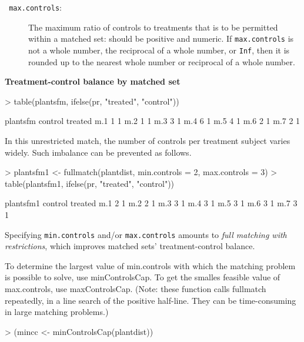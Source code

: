 \documentclass[12pt,twoside]{article}
\begin{document}
{{\begin{description}
\item[\texttt{ max.controls}:] The maximum ratio of controls
to treatments that is to be permitted within a matched set: should
be positive and numeric. If \texttt{max.controls} is not a whole
number, the reciprocal of a whole number, or \texttt{Inf}, then
it is rounded up to the nearest whole number or reciprocal of a
whole number.
\end{description}
\bigskip

{\rmfamily\bfseries
Treatment{}-control balance by matched set}


\begin{Schunk}
\begin{Sinput}
> table(plantsfm, ifelse(pr, "treated", "control"))
\end{Sinput}
\begin{Soutput}
plantsfm control treated
     m.1       1       1
     m.2       1       1
     m.3       3       1
     m.4       6       1
     m.5       4       1
     m.6       2       1
     m.7       2       1
\end{Soutput}
\end{Schunk}

\bigskip

{\ttfamily
\textrm{In this unrestricted match, the number of controls per treatment
subject varies widely. Such imbalance can be prevented as follows.}}


\bigskip
\begin{Schunk}
\begin{Sinput}
> plantsfm1 <- fullmatch(plantdist, min.controls = 2, max.controls = 3)
> table(plantsfm1, ifelse(pr, "treated", "control"))
\end{Sinput}
\begin{Soutput}
plantsfm1 control treated
      m.1       2       1
      m.2       2       1
      m.3       3       1
      m.4       3       1
      m.5       3       1
      m.6       3       1
      m.7       3       1
\end{Soutput}
\end{Schunk}

{\ttfamily
\textrm{Specifying }\texttt{min.controls}\textrm{ and/or }\texttt{max.controls}\textrm{
amounts to }\textrm{\textit{full matching with restrictions}}\textrm{,
which improves matched sets' treatment{}-control
balance.}}

{\ttfamily
\textrm{To determine the largest value of} min.controls \textrm{with which the
  matching problem is possible to solve, use}
minControlsCap. \textrm{To get the smalles feasible value of}
max.controls, \textrm{use} maxControlsCap. \textrm{(Note: these function calls} fullmatch
\textrm{repeatedly, in a line search of the positive half-line.  They
  can be time-consuming in large matching problems.)}}
\begin{Schunk}
\begin{Sinput}
> (mincc <- minControlsCap(plantdist))
\end{Sinput}
\end{Schunk}}}
\end{document}
